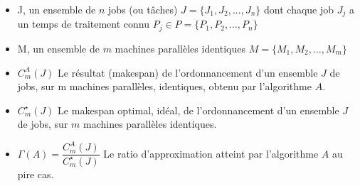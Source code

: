 \documentclass[a4paper,12pt]{report}
\theoremstyle{plain}				%
\theoremstyle{definition}				%
\newcommand\problemGrahamPm{$P_m||C_{\max}$\xspace}
\newcommand{\tdi}[1]{\todo[inline]{{#1}}{}}
\newcommand{\lp}[1]{\todo[author=LP,color=yellow,inline]{#1}}
\begin{document}
\begin{itemize}
\item J, un ensemble de $n$ jobs (ou tâches) 
	$J = \{J_1, J_2, ..., J_n\}$ 
dont chaque job $J_j$ a un temps de traitement connu 
	$P_j \in P = \{P_1, P_2, ..., P_n\}$

\item M, un ensemble de $m$ machines parallèles identiques 
	$M = \{M_1, M_2, \ldots, M_m\}$



\item $C_m^A(J)$ Le résultat (makespan) de l'ordonnancement 
	d'un ensemble $J$ de jobs, 
	sur m machines parallèles, identiques, 
	obtenu par l'algorithme $A$.

\item $C_m^\star(J)$ Le makespan optimal, idéal, de l'ordonnancement 
	d'un ensemble $J$ de jobs, 
	sur $m$ machines parallèles identiques.
\item $\Gamma(A)=\dfrac{C_m^A(J)}{C_m^\star(J)}$ 
	Le ratio d'approximation atteint par l'algorithme $A$ au pire cas.

\end{itemize}
\end{document}
